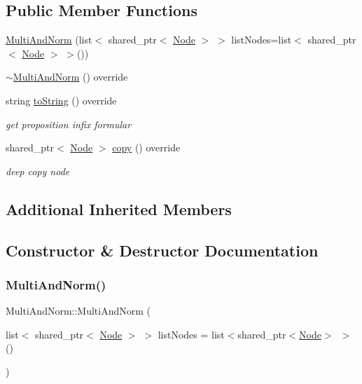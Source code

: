 \subsection*{Public Member Functions}
\begin{DoxyCompactItemize}
\item 
\hyperlink{class_multi_and_norm_aee4c9190024a62f701bd02155115fbf0}{Multi\+And\+Norm} (list$<$ shared\+\_\+ptr$<$ \hyperlink{class_node}{Node} $>$ $>$ list\+Nodes=list$<$ shared\+\_\+ptr$<$ \hyperlink{class_node}{Node} $>$ $>$())
\item 
\hyperlink{class_multi_and_norm_a3aec280d3f9c2df9ed0eb91e61f8bb4f}{$\sim$\+Multi\+And\+Norm} () override
\item 
string \hyperlink{class_multi_and_norm_a84940789d331007c430096a38f60d124}{to\+String} () override
\begin{DoxyCompactList}\small\item\em get proposition infix formular \end{DoxyCompactList}\item 
shared\+\_\+ptr$<$ \hyperlink{class_node}{Node} $>$ \hyperlink{class_multi_and_norm_a77cbaf6920daa86d9ddc80b2a839a84f}{copy} () override
\begin{DoxyCompactList}\small\item\em deep copy node \end{DoxyCompactList}\end{DoxyCompactItemize}
\subsection*{Additional Inherited Members}


\subsection{Constructor \& Destructor Documentation}
\mbox{\label{class_multi_and_norm_aee4c9190024a62f701bd02155115fbf0}} 
\subsubsection{\texorpdfstring{Multi\+And\+Norm()}{MultiAndNorm()}}
{\footnotesize\ttfamily Multi\+And\+Norm\+::\+Multi\+And\+Norm (\begin{DoxyParamCaption}\item[{list$<$ shared\+\_\+ptr$<$ \hyperlink{class_node}{Node} $>$ $>$}]{list\+Nodes = {\ttfamily list$<$shared\+\_\+ptr$<$\hyperlink{class_node}{Node}$>$~$>$()} }\end{DoxyParamCaption})\hspace{0.3cm}{\ttfamily [explicit]}}

